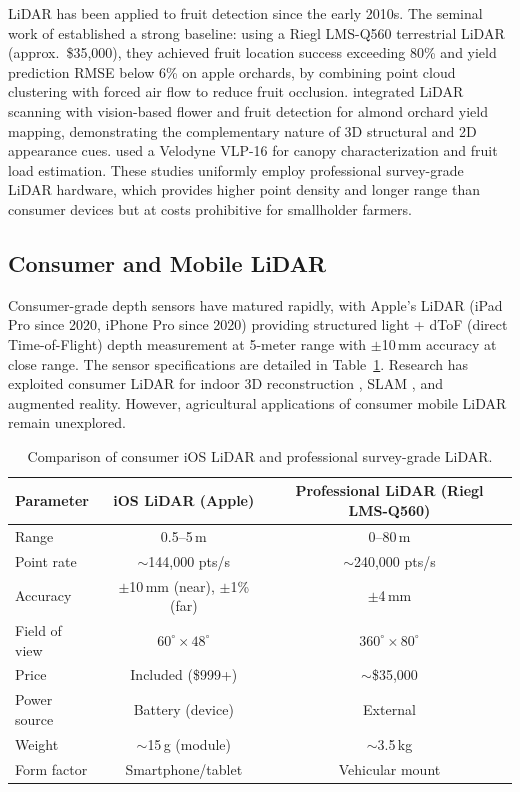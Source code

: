 \documentclass[12pt,a4paper]{article}
\begin{document}
LiDAR has been applied to fruit detection since the early 2010s. The seminal work of \citet{gene-mola-2020} established a strong baseline: using a Riegl LMS-Q560 terrestrial LiDAR (approx.\ \$35,000), they achieved fruit location success exceeding 80\% and yield prediction RMSE below 6\% on apple orchards, by combining point cloud clustering with forced air flow to reduce fruit occlusion. \citet{underwood-2016} integrated LiDAR scanning with vision-based flower and fruit detection for almond orchard yield mapping, demonstrating the complementary nature of 3D structural and 2D appearance cues. \citet{reiser-2018} used a Velodyne VLP-16 for canopy characterization and fruit load estimation. These studies uniformly employ professional survey-grade LiDAR hardware, which provides higher point density and longer range than consumer devices but at costs prohibitive for smallholder farmers.

\subsection{Consumer and Mobile LiDAR}

Consumer-grade depth sensors have matured rapidly, with Apple's LiDAR (iPad Pro since 2020, iPhone Pro since 2020) providing structured light + dToF (direct Time-of-Flight) depth measurement at 5-meter range with $\pm$10\,mm accuracy at close range. The sensor specifications are detailed in Table~\ref{tab:comparison}. Research has exploited consumer LiDAR for indoor 3D reconstruction \citep{zhang-2020}, SLAM \citep{sucar-2021}, and augmented reality. However, agricultural applications of consumer mobile LiDAR remain unexplored.

\begin{table}[htbp]
\centering
\caption{Comparison of consumer iOS LiDAR and professional survey-grade LiDAR.}
\label{tab:comparison}
\begin{tabular}{lcc}
\toprule
Parameter & iOS LiDAR (Apple) & Professional LiDAR (Riegl LMS-Q560) \\
\midrule
Range & 0.5--5\,m & 0--80\,m \\
Point rate & $\sim$144,000 pts/s & $\sim$240,000 pts/s \\
Accuracy & $\pm$10\,mm (near), $\pm$1\% (far) & $\pm$4\,mm \\
Field of view & $60^\circ \times 48^\circ$ & $360^\circ \times 80^\circ$ \\
Price & Included (\$999+) & $\sim$\$35,000 \\
Power source & Battery (device) & External \\
Weight & $\sim$15\,g (module) & $\sim$3.5\,kg \\
Form factor & Smartphone/tablet & Vehicular mount \\
\bottomrule
\end{tabular}
\end{table}
\end{document}
